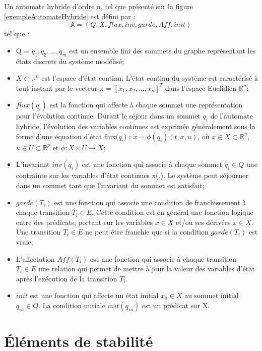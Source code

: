 \begin{definition}{Un automate hybride d'ordre n, tel que présenté sur la figure \ref{exempleAutomateHybride} est défini par :}\\
\[\mathbb{A} = (Q, X, flux, inv, garde, Aff, init)\]
tel que :
\label{def:autom-hybride}
\begin{itemize}
\item Q = {$q_1, q_2, \ldots, q_m$} est un ensemble fini des sommets du graphe représentant les états discrets du système modélisé;
\item $X \subset \mathbb{R}^n$ est l'espace d'état continu. L'état continu du système est caractérisé à tout instant par le vecteur x = $[x_1, x_2, \ldots, x_n]^T$ dans l'espace Euclidien $\mathbb{R}^n$;
\item $flux(q_i)$ est la fonction qui affecte à chaque sommet une représentation pour l'évolution continue. Durant le séjour dans un sommet $q_i$ de l'automate hybride, l'évolution des variables continues est exprimée généralement sous la forme d'une équation d'état flux($q_i$) : $\dot{x} = \phi (q_i)(t,x,u)$, où $x \in X \subset \mathbb{R}^n$, $u \in U \subset \mathbb{R}^p$ et $\phi : X \times U \rightarrow X$;
\item L'invariant $inv(q_i)$ est une fonction qui associe à chaque sommet $q_i \in Q$ une contrainte sur les variables d'état continues x(.). Le système peut séjourner dans un sommet tant que l'invariant du sommet est satisfait;
\item $garde(T_i)$ est une fonction qui associe une condition de franchissement à chaque transition $T_i \in E$. Cette condition est en général une fonction logique entre des prédicats, portant sur les variables $x \in X$ et/ou ses dérivées $\dot{x} \in X$. Une transition $T_i \in E$ ne peut être franchie que si la condition $garde(T_i)$ est vraie;
\item L'affectation $Aff(T_i)$ est une fonction qui associe à chaque transition $T_i \in E$ une relation qui permet de mettre à jour la valeur des variables d'état après l'exécution de la transition $T_i$.
\item $init$ est une fonction qui affecte un état initial $x_0 \in X$ au sommet initial $q_{in} \in Q$. La condition initiale $init(q_{in})$ est un prédicat sur X.
\end{itemize}

\end{definition}

\section{Éléments de stabilité}
